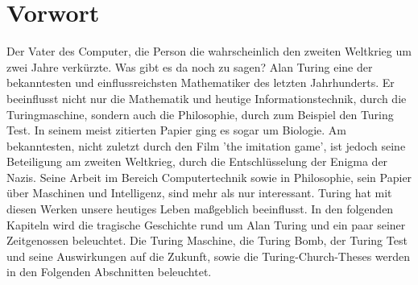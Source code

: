 \section{Vorwort}
Der Vater des Computer, die Person die wahrscheinlich den zweiten Weltkrieg um zwei Jahre verkürzte. Was gibt es da noch zu sagen? Alan Turing eine der bekanntesten und einflussreichsten Mathematiker des letzten Jahrhunderts. Er beeinflusst nicht nur die Mathematik und heutige Informationstechnik, durch die Turingmaschine, sondern auch die Philosophie, durch zum Beispiel den Turing Test. In seinem meist zitierten Papier ging es sogar um Biologie. Am bekanntesten, nicht zuletzt durch den Film 'the imitation game', ist jedoch seine Beteiligung am zweiten Weltkrieg, durch die Entschlüsselung der Enigma der Nazis. Seine Arbeit im Bereich Computertechnik sowie in Philosophie, sein Papier über Maschinen und Intelligenz, sind mehr als nur interessant. Turing hat mit diesen Werken unsere heutiges Leben maßgeblich beeinflusst. In den folgenden Kapiteln wird die tragische Geschichte rund um Alan Turing und ein paar seiner Zeitgenossen beleuchtet. Die Turing Maschine, die Turing Bomb, der Turing Test und seine Auswirkungen auf die Zukunft, sowie die Turing-Church-Theses werden in den Folgenden Abschnitten beleuchtet.